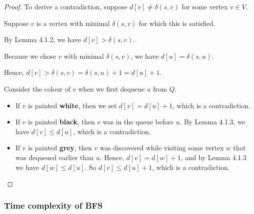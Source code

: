 \begin{proof}
    To derive a contradiction, suppose $d[v] \neq \delta(s, v)$ for some vertex $v \in V$.

    Suppose $v$ is a vertex with minimal $\delta(s, v)$ for which this is satisfied.

    By Lemma 4.1.2, we have $d[v] > \delta(s, v)$.


    Because we chose $v$ with minimal $\delta(s, v)$, we have $d[u] = \delta(s, u)$.

    Hence, $d[v] > \delta(s, v) = \delta(s, u) + 1 = d[u] + 1$.

    Consider the colour of $v$ when we first dequeue $u$ from $Q$.

    \begin{itemize}
        \item If $v$ is painted \textbf{white}, then we set $d[v] = d[u] + 1$, which is a contradiction.
        \item If $v$ is painted \textbf{black}, then $v$ was in the queue before $u$. By Lemma 4.1.3, we have $d[v] \le d[u]$, which is a contradiction.
        \item If $v$ is painted \textbf{grey}, then $v$ was discovered while visiting some vertex $w$ that was dequeued earlier than $u$. Hence, $d [v] = d[w] + 1$, and by Lemma 4.1.3 we have $d[w] \le d[u]$. So $d[v] \le d[u] + 1$, which is a contradiction.
    \end{itemize}
\end{proof}

\subsubsection{Time complexity of BFS}


